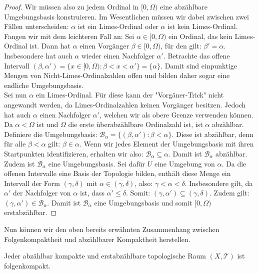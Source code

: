 \documentclass[11pt]{scrartcl}
\begin{document}
\begin{proof}
	Wir müssen also zu jedem Ordinal in $[0,\Omega)$ eine abzählbare Umgebungsbasis konstruieren. Im Wesentlichen müssen wir dabei zwischen zwei
	Fällen unterscheiden: $\alpha$ ist ein Limes-Ordinal oder $\alpha$ ist kein Limes-Ordinal.\\
	Fangen wir mit dem leichteren Fall an: Sei $\alpha\in [0,\Omega)$ ein Ordinal, das kein Limes-Ordinal ist. Dann hat $\alpha$ einen Vorgänger $\beta \in [0,\Omega)$,
	für den gilt: $\beta'=\alpha$. Insbesondere hat auch $\alpha$ wieder einen Nachfolger $\alpha'$. Betrachte das offene Intervall $(\beta,\alpha')=\{x\in[0,\Omega): \beta < x <\alpha'\}
	= \{\alpha\}$. Damit sind einpunktige Mengen von Nicht-Limes-Ordinalzahlen offen und bilden daher sogar eine endliche Umgebungsbasis. \\
	Sei nun $\alpha$ ein Limes-Ordinal. Für diese kann der "Vorgäner-Trick" nicht angewandt werden, da Limes-Ordinalzahlen keinen Vorgänger besitzen. Jedoch hat auch $\alpha$ einen Nachfolger
	$\alpha'$, welchen wir als obere Grenze verwenden können. Da $\alpha < \Omega$ ist und $ \Omega $ die erste überabzählbare Ordinalzahl ist, ist $\alpha$ abzählbar. Definiere die Umgebungsbasis:
	$\mathcal B_\alpha = \{(\beta, \alpha'): \beta <\alpha\}$. Diese ist abzählbar, denn für alle $\beta < \alpha$ gilt: $\beta \in \alpha$. Wenn wir jedes Element der Umgebungsbasis mit ihren Startpunkten
	identifizieren, erhalten wir also: $\mathcal B_\alpha \subseteq \alpha$. Damit ist $\mathcal B_\alpha$ abzählbar.\\
	Zudem ist $\mathcal B_\alpha$ eine Umgebungsbasis. Sei dafür $U$ eine Umgebung von $\alpha$. Da die offenen Intervalle eine Basis der Topologie bilden, enthält diese Menge ein
	Intervall der Form $(\gamma, \delta)$ mit $\alpha \in (\gamma, \delta)$, also: $\gamma < \alpha < \delta$. Insbesondere gilt, da $\alpha'$ der Nachfolger von $\alpha$ ist, dass
	$\alpha' \leq \delta$. Somit: $(\gamma, \alpha')\subseteq (\gamma, \delta)$. Zudem gilt: $(\gamma,\alpha')\in \mathcal B_\alpha$. Damit ist $\mathcal B_\alpha$ eine Umgebungsbasis und somit
	$[0,\Omega)$ erstabzählbar.
\end{proof}
Nun können wir den oben bereits erwähnten Zusammenhang zwischen Folgenkompaktheit und abzählbarer 
Kompaktheit herstellen.
\begin{theorem}
	Jeder abzählbar kompakte und erstabzählbare topologische Raum $(X,\mathcal T)$ ist folgenkompakt.
\end{theorem}
\end{document}
